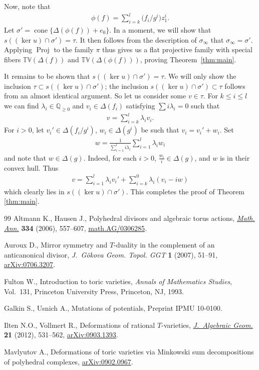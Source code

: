 \documentclass[11pt]{article}
\newcommand{\QQ}{\mathbb{Q}}
\newcommand{\tv}{\mathbb{TV}}
\DeclareMathOperator{\Proj}{Proj}
\DeclareMathOperator{\cone}{cone}
\begin{document}
Now, note that
\begin{gather*}
\phi(f)=\sum_{i=k}^l \big(f_i/g^i\big)z_1^i.
\end{gather*}
Let $\sigma'=\cone\{\Delta(\phi(f))+e_0\}$. In a moment, we will show that $s( (\ker u)\cap \sigma')=\tau$. It then follows from the description of $\sigma_\infty$ that $\sigma_\infty=\sigma'$. Applying $\Proj$ to the family $\pi$ thus gives us a f\/lat projective family with special f\/ibers $\tv(\Delta(f))$ and $\tv(\Delta(\phi(f)))$, proving Theorem~\ref{thm:main}.

It remains to be shown that $s( (\ker u)\cap \sigma')=\tau$. We will only show the inclusion $\tau \subset s( (\ker u)\cap \sigma')$; the inclusion $s( (\ker u)\cap \sigma')\subset \tau$ follows from an almost identical argument. So let us consider some $v\in\tau$. For $k\leq i \leq l$ we can f\/ind $\lambda_i\in\QQ_{\geq 0}$ and $v_i\in\Delta(f_i)$ satisfying $\sum i\lambda_i=0$ such that
\begin{gather*}
v=\sum_{i=k}^l \lambda_i v_i.
\end{gather*}
For $i>0$, let $v_i'\in\Delta(f_i/g^i)$, $w_i\in\Delta(g^i)$ be such that $v_i=v_i'+w_i$.
Set
\begin{gather*}
w=\frac{1}{\sum\limits_{i=1}^l i \lambda_i}
\sum\limits_{i=1}^l{\lambda_i w_i}\end{gather*}
and note that $w\in\Delta(g)$.
Indeed, for each $i>0$, $\frac{w_i}{i}\in\Delta(g)$, and $w$ is in their convex hull.
Thus
\begin{gather*}
v=\sum_{i=1}^l \lambda_i v_i'+\sum_{i=k}^0 \lambda_i(v_i-iw)
\end{gather*}
which clearly lies in $s( (\ker u)\cap \sigma')$. This completes the proof of Theorem \ref{thm:main}.
\begin{thebibliography}{99}
Altmann K., Hausen J., Polyhedral divisors and algebraic torus actions,
  \href{http://dx.doi.org/10.1007/s00208-005-0705-8}{\textit{Math. Ann.}} \textbf{334} (2006), 557--607, \href{http://arxiv.org/abs/math.AG/0306285}{math.AG/0306285}.

Auroux D., Mirror symmetry and {$T$}-duality in the complement of an
  anticanonical divisor, \textit{J.~G\"okova Geom. Topol. GGT} \textbf{1}
  (2007), 51--91, \href{http://arxiv.org/abs/0706.3207}{arXiv:0706.3207}.

Fulton W., Introduction to toric varieties, \textit{Annals of Mathematics
  Studies}, Vol.~131, Princeton University Press, Princeton, NJ, 1993.

Galkin S., Usnich A., Mutations of potentials, {P}reprint IPMU 10-0100.

Ilten N.O., Vollmert R., Deformations of rational $T$-varieties,
  \href{http://dx.doi.org/10.1090/S1056-3911-2011-00585-7}{\textit{J.~Algebraic Geom.}} \textbf{21} (2012), 531--562, \href{http://arxiv.org/abs/0903.1393}{arXiv:0903.1393}.

Mavlyutov A., Deformations of toric varieties via {M}inkowski sum
  decompositions of polyhedral complexes, \href{http://arxiv.org/abs/0902.0967}{arXiv:0902.0967}.

\end{thebibliography}
\end{document}
